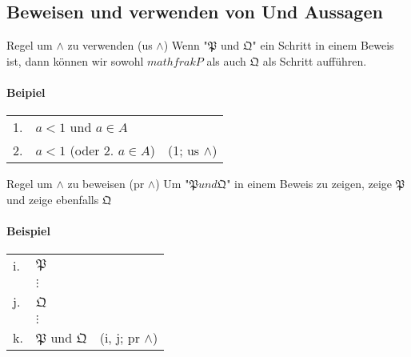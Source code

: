     \subsection{Beweisen und verwenden von Und Aussagen}
        {
            Regel um \(\wedge\) zu verwenden (us \(\wedge\))
        }
        {
            Wenn "\(\mathfrak{P}\) und \(\mathfrak{Q}\)" ein Schritt in einem Beweis ist, dann können wir sowohl \(mathfrak{P}\) als auch \(\mathfrak{Q}\) als Schritt aufführen.
        }
        \paragraph{Beipiel\\}
        \begin{tabular}{p{0.8cm}p{6cm}p{4cm}}
            1. & \(a < 1\) und \(a \in A\) & \\
            2. & \(a < 1 \) (oder 2. \(a \in A\)) & (1; us \(\wedge\)) \\
        \end{tabular}
        {
            Regel um \(\wedge\) zu beweisen (pr \(\wedge\))
        }
        {
            Um "\(\mathfrak{P} und \mathfrak{Q}\)" in einem Beweis zu zeigen, zeige \(\mathfrak{P}\) und zeige ebenfalls \(\mathfrak{Q}\)
        }
        \paragraph{Beispiel\\}
            \begin{tabular}{p{0.8cm}p{6cm}p{4cm}}
                i. & \(\mathfrak{P}\) & \\
                   & \(\vdots\) & \\
                j. & \(\mathfrak{Q}\) & \\
                   & \(\vdots\) & \\
                k. & \(\mathfrak{P}\) und \(\mathfrak{Q}\) & (i, j; pr \(\wedge\)) \\
            \end{tabular}
